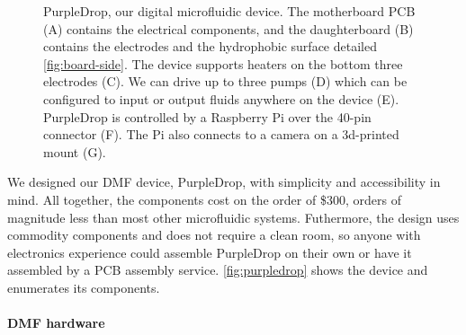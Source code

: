 \documentclass[sigconf, screen]{acmart}
\begin{document}
\begin{figure}
  \centering
  \caption{
    PurpleDrop, our digital microfluidic device.
    The motherboard PCB ({\sf A}) contains the electrical components, and the daughterboard ({\sf B}) contains the electrodes and the hydrophobic surface detailed \autoref{fig:board-side}.
    The device supports heaters on the bottom three electrodes ({\sf C}).
    We can drive up to three pumps ({\sf D}) which can be configured to input or output fluids anywhere on the device ({\sf E}).
    PurpleDrop is controlled by a Raspberry Pi over the 40-pin connector ({\sf F}).
    The Pi also connects to a camera on a 3d-printed mount (\sf G).
  }
  \label{fig:purpledrop}

\end{figure}

We designed our DMF device, PurpleDrop, with simplicity and accessibility in mind.
All together, the components cost on the order of \$300, orders of magnitude less than most other microfluidic systems.
Futhermore, the design uses commodity components and does not require a clean room, so anyone with electronics experience could assemble PurpleDrop on their own or have it assembled by a PCB assembly service.
\autoref{fig:purpledrop} shows the device and enumerates its components.

\paragraph{DMF hardware}
\end{document}

